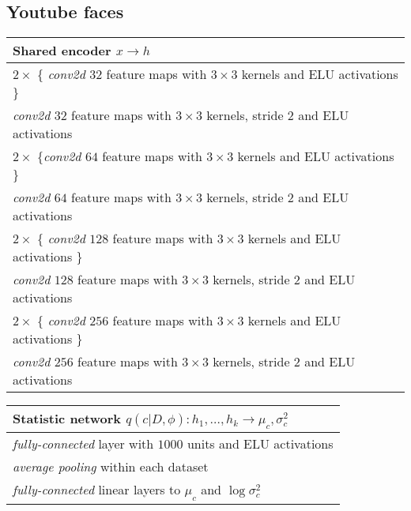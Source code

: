 \documentclass{article} \usepackage{iclr2017_conference,times}
\begin{document}
\subsection{Youtube faces}
\label{appendixb:faces}
\begin{table}[H]

    \begin{tabular}{  l}
    \bf{Shared encoder} $x \to h$ \\ \hline
    $2 \times$ \{ \emph{conv2d} $32$ feature maps with $3 \times 3$ kernels and ELU activations \} \\
    \emph{conv2d} $32$ feature maps with $3 \times 3$ kernels, stride $2$ and ELU activations \\
    
    $2 \times$ \{\emph{conv2d} $64$ feature maps with $3 \times 3$ kernels and ELU activations \} \\
    \emph{conv2d} $64$ feature maps with $3 \times 3$ kernels, stride $2$ and ELU activations  \\
    
    $2 \times$ \{ \emph{conv2d} $128$ feature maps with $3 \times 3$ kernels and ELU activations \} \\
    \emph{conv2d} $128$ feature maps with $3 \times 3$ kernels, stride $2$ and ELU activations \\
    
    $2 \times$ \{ \emph{conv2d} $256$ feature maps with $3 \times 3$ kernels and ELU activations \} \\
    \emph{conv2d} $256$ feature maps with $3 \times 3$ kernels, stride $2$ and ELU activations
\label{table:faces_common_encoder}
    \end{tabular}
\end{table}
\begin{table}[H]

    \begin{tabular}{  l}
    \bf{Statistic network} $q(c | D, \phi): h_1, \dots, h_k \to \mu_c, \sigma^2_c$ \\ \hline
    \emph{fully-connected} layer with $1000$ units and ELU activations \\
    \emph{average pooling} within each dataset\\
    \emph{fully-connected} linear layers to $\mu_c$ and $\log \sigma^2_c$
\label{table:faces_statistic_network}
    \end{tabular}
\end{table}
\end{document}
